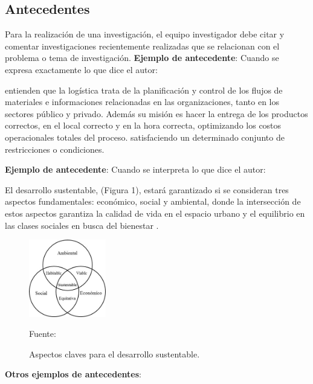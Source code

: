 \documentclass[a4paper, 12pt]{article}
\begin{document}
\subsection{Antecedentes}
Para la realización de una investigación, el equipo investigador debe 
citar y comentar investigaciones recientemente realizadas que se relacionan con el problema o tema de investigación.
\vskip 0.3cm
{\bf Ejemplo de antecedente}: Cuando se expresa exactamente lo que dice el autor:\par
\vskip 0.3cm
\cite{Ghiani} entienden que la logística trata de la planificación y control de los flujos de materiales e informaciones relacionadas en las organizaciones, tanto en los sectores público y privado. Además su misión es hacer la entrega de los productos correctos, en el local correcto y en la hora correcta, optimizando los costos operacionales totales del proceso.
satisfaciendo un determinado conjunto de restricciones o condiciones.\par
\vskip 0.4cm
{\bf Ejemplo de antecedente}: Cuando se interpreta lo que dice el autor:\par

El desarrollo sustentable, (Figura 1), estará garantizado si se consideran tres aspectos fundamentales: económico, social y ambiental, donde la intersección de estos aspectos garantiza la calidad de vida en el espacio urbano y el equilibrio en las clases sociales en busca del bienestar \citep{Tanguay}.

\begin{figure}[ht]
\begin{center}
\includegraphics[width=0.3\textwidth]{Figura2}
\end{center}
\begin{center}
\vskip -0.5cm
\caption{\small{Aspectos claves para el desarrollo sustentable.}}
{\small{Fuente: \cite{Tanguay}}}
\end{center}
\end{figure}


\vskip 0.4cm
{\bf Otros ejemplos de antecedentes}: \par
\end{document}
